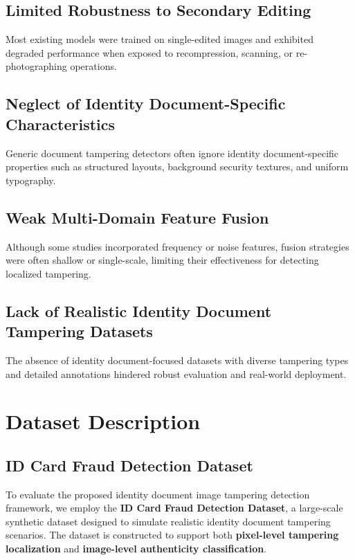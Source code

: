 \documentclass[12pt]{article}
\begin{document}
\subsection{Limited Robustness to Secondary Editing}
Most existing models were trained on single-edited images and exhibited degraded performance when exposed to recompression, scanning, or re-photographing operations.

\subsection{Neglect of Identity Document-Specific Characteristics}
Generic document tampering detectors often ignore identity document-specific properties such as structured layouts, background security textures, and uniform typography.

\subsection{Weak Multi-Domain Feature Fusion}
Although some studies incorporated frequency or noise features, fusion strategies were often shallow or single-scale, limiting their effectiveness for detecting localized tampering.

\subsection{Lack of Realistic Identity Document Tampering Datasets}
The absence of identity document-focused datasets with diverse tampering types and detailed annotations hindered robust evaluation and real-world deployment.

\section{Dataset Description}

\subsection{ID Card Fraud Detection Dataset}

To evaluate the proposed identity document image tampering detection framework, we employ the \textbf{ID Card Fraud Detection Dataset}, a large-scale synthetic dataset designed to simulate realistic identity document tampering scenarios. The dataset is constructed to support both \textbf{pixel-level tampering localization} and \textbf{image-level authenticity classification}.
\end{document}
